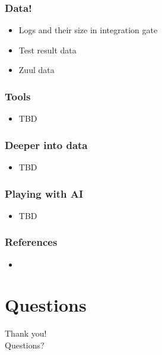 \documentclass[aspectratio=169,11pt,hyperref={colorlinks=true}]{beamer}
\begin{document}

\begin{frame}
    \frametitle{Data!}
    \begin{itemize}
        \item{Logs and their size in integration gate}
        \item{Test result data}
        \item{Zuul data}
    \end{itemize}
\end{frame}


\begin{frame}
    \frametitle{Tools}
    \begin{itemize}
        \item{TBD}
    \end{itemize}
\end{frame}

\begin{frame}
    \frametitle{Deeper into data}
    \begin{itemize}
        \item{TBD}
    \end{itemize}
\end{frame}

\begin{frame}
    \frametitle{Playing with AI}
    \begin{itemize}
        \item{TBD}
    \end{itemize}
\end{frame}

\begin{frame}
    \frametitle{References}
    \begin{itemize}
        \item{}
    \end{itemize}
\end{frame}


\section{Questions}
\begin{frame}[c]
    \begin{center}
        \Huge Thank you!\\Questions?
    \end{center}
\end{frame}
\end{document}
